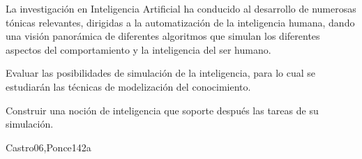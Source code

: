\begin{syllabus}


\begin{justification}
La investigación en Inteligencia Artificial ha conducido al desarrollo de
numerosas tónicas relevantes, dirigidas a la automatización de la
inteligencia humana, dando una visión panorámica de diferentes
algoritmos que simulan los diferentes aspectos del comportamiento
y la inteligencia del ser humano.
\end{justification}

\begin{goals}
    \item Evaluar las posibilidades de simulación de la inteligencia, para lo cual se estudiarán las técnicas de modelización del conocimiento.
    \item Construir una noción de inteligencia que soporte después las tareas de su simulación.
\end{goals}


\begin{unit}{\ISFundamentalIssues}{}{Castro06,Ponce14}{2}{a}
    \begin{topics}
        \item \ISFundamentalIssuesTopicOverview
        \item \ISFundamentalIssuesTopicWhat
        \item \ISFundamentalIssuesTopicProblem
        \item \ISFundamentalIssuesTopicNature
        \item \ISFundamentalIssuesTopicPhilosophical
    \end{topics}
    \begin{learningoutcomes}
        \item \ISFundamentalIssuesLODescribeTuring [\Usage]
        \item \ISFundamentalIssuesLODeterming [\Usage]
    \end{learningoutcomes}
\end{unit}


\end{syllabus}
